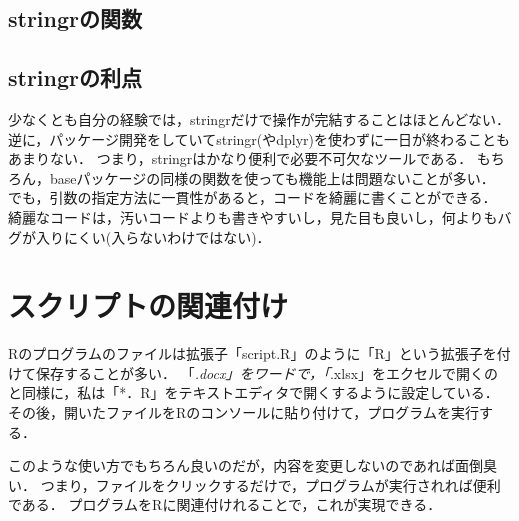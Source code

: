 \documentclass[
]{article}
\begin{document}
\hypertarget{stringrux306eux95a2ux6570}{%
\subsection{stringrの関数}\label{stringrux306eux95a2ux6570}}

\hypertarget{stringrux306eux5229ux70b9}{%
\subsection{stringrの利点}\label{stringrux306eux5229ux70b9}}

少なくとも自分の経験では，stringrだけで操作が完結することはほとんどない．
逆に，パッケージ開発をしていてstringr(やdplyr)を使わずに一日が終わることもあまりない．
つまり，stringrはかなり便利で必要不可欠なツールである．
もちろん，baseパッケージの同様の関数を使っても機能上は問題ないことが多い．
でも，引数の指定方法に一貫性があると，コードを綺麗に書くことができる．
綺麗なコードは，汚いコードよりも書きやすいし，見た目も良いし，何よりもバグが入りにくい(入らないわけではない)．

\hypertarget{assoc}{%
\section{スクリプトの関連付け}\label{assoc}}

Rのプログラムのファイルは拡張子「script.R」のように「R」という拡張子を付けて保存することが多い．
「\emph{.docx」をワードで，「}.xlsx」をエクセルで開くのと同様に，私は「*．R」をテキストエディタで開くするように設定している．
その後，開いたファイルをRのコンソールに貼り付けて，プログラムを実行する．

このような使い方でもちろん良いのだが，内容を変更しないのであれば面倒臭い．
つまり，ファイルをクリックするだけで，プログラムが実行されれば便利である．
プログラムをRに関連付けれることで，これが実現できる．
\end{document}
